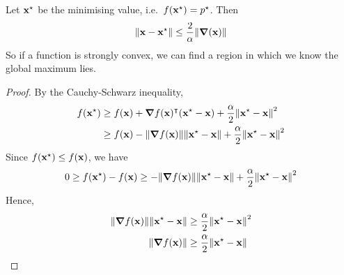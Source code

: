 \begin{claim}
	Let \(\vb x^\star\) be the minimising value, i.e.\ \(f(\vb x^\star) = p^\star\).
	Then
	\[
		\norm{\vb x - \vb x^\star} \leq \frac{2}{\alpha} \norm{\grad(\vb x)}
	\]
	So if a function is strongly convex, we can find a region in which we know the global maximum lies.
\end{claim}
\begin{proof}
	By the Cauchy-Schwarz inequality,
	\begin{align*}
		f(\vb x^\star) & \geq f(\vb x) + \grad{f(\vb x)}^\intercal (\vb x^\star - \vb x) + \frac{\alpha}{2}\norm{\vb x^\star - \vb x}^2              \\
		               & \geq f(\vb x) - \norm{\grad{f(\vb x)}} \norm{\vb x^\star - \vb x} + \frac{\alpha}{2}\norm{\vb x^\star - \vb x}^2
	\end{align*}
	Since \(f(\vb x^\star) \leq f(\vb x)\), we have
	\[
		0 \geq f(\vb x^\star) - f(\vb x) \geq - \norm{\grad{f(\vb x)}} \norm{\vb x^\star - \vb x} + \frac{\alpha}{2}\norm{\vb x^\star - \vb x}^2
	\]
	Hence,
	\begin{align*}
		\norm{\grad{f(\vb x)}} \norm{\vb x^\star - \vb x} & \geq \frac{\alpha}{2}\norm{\vb x^\star - \vb x}^2 \\
		\norm{\grad{f(\vb x)}}                            & \geq \frac{\alpha}{2}\norm{\vb x^\star - \vb x}   \\
	\end{align*}
\end{proof}
